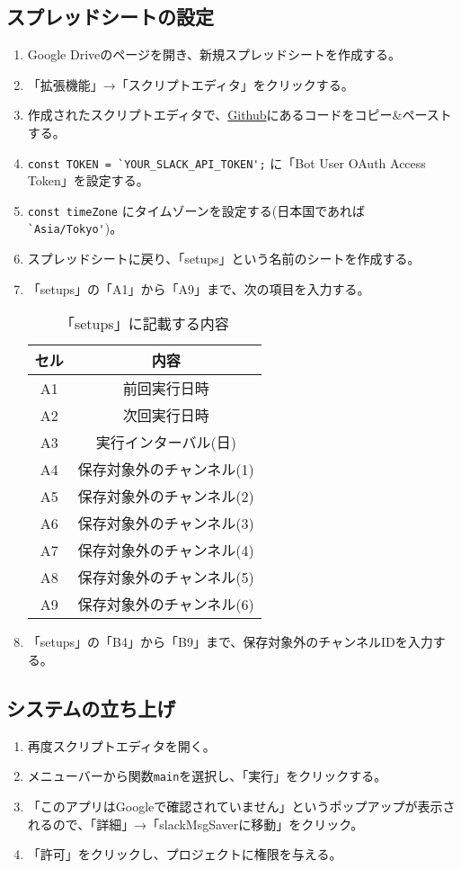\documentclass[a4j, 11pt, dvipdfmx]{jsarticle}
\begin{document}
\subsection{スプレッドシートの設定}
\begin{enumerate}
\item Google Driveのページを開き、新規スプレッドシートを作成する。
\item 「拡張機能」→「スクリプトエディタ」をクリックする。
\item 作成されたスクリプトエディタで、\href{https://github.com/RjChiba/slackMsgSaver/blob/main/main.js}{Github}にあるコードをコピー\&ペーストする。
\item \verb|const TOKEN = `YOUR_SLACK_API_TOKEN';| に「Bot User OAuth Access Token」を設定する。
\item \verb|const timeZone| にタイムゾーンを設定する(日本国であれば\verb|`Asia/Tokyo'|)。
\item スプレッドシートに戻り、「setups」という名前のシートを作成する。
\item 「setups」の「A1」から「A9」まで、次の項目を入力する。

\begin{table}[htp]
\caption{「setups」に記載する内容}
\begin{center}
\begin{tabular}{|c|c|}
\hline
セル & 内容\\
\hline
A1 & 前回実行日時\\
A2 & 次回実行日時\\
A3 & 実行インターバル(日)\\
A4 & 保存対象外のチャンネル(1)\\
A5 & 保存対象外のチャンネル(2)\\
A6 & 保存対象外のチャンネル(3)\\
A7 & 保存対象外のチャンネル(4)\\
A8 & 保存対象外のチャンネル(5)\\
A9 & 保存対象外のチャンネル(6)\\
\hline
\end{tabular}
\end{center}
\end{table}%

\item 「setups」の「B4」から「B9」まで、保存対象外のチャンネルIDを入力する。
\end{enumerate}

\subsection{システムの立ち上げ}
\begin{enumerate}
\item 再度スクリプトエディタを開く。
\item メニューバーから関数\verb|main|を選択し、「実行」をクリックする。
\item 「このアプリはGoogleで確認されていません」というポップアップが表示されるので、「詳細」→「slackMsgSaverに移動」をクリック。
\item 「許可」をクリックし、プロジェクトに権限を与える。
\end{enumerate}
\end{document}
